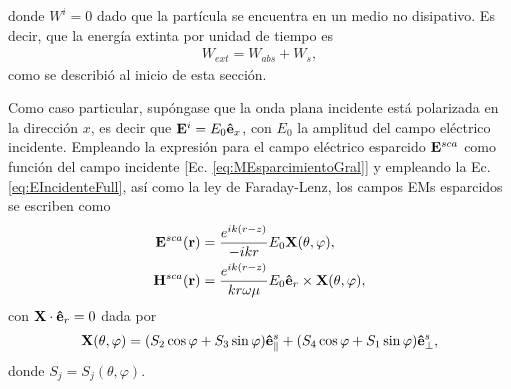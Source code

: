 donde $W^i=0$ dado que la partícula se encuentra en un medio no disipativo. Es decir, que la energía extinta por unidad de tiempo es
%
\begin{align}
W_{ext} = W_{abs} + W_s,
\end{align}
%
como se describió al inicio de esta sección.	

Como caso particular, supóngase que la onda plana incidente está polarizada en la dirección $x$, es decir que $\vb{E}^i = E_0\vu{e}_x$, con $E_0$	 la amplitud del campo eléctrico incidente. Empleando la  expresión para el campo eléctrico esparcido $\vb{E}^{sca}$ como función del campo incidente [Ec. \eqref{eq:MEsparcimientoGral}] y empleando la Ec. \eqref{eq:EIncidenteFull}, así como la ley de Faraday-Lenz, los campos EMs esparcidos se escriben como
%
\begin{align}
\vb{E}^{sca}(\vb{r}) &= \frac{e^{ik(r-z)}}{-ikr}E_0\vb{X}(\theta,\varphi),
\label{eq:EscaX}\\
\vb{H}^{sca}(\vb{r}) &= \frac{e^{ik(r-z)}}{kr\omega\mu}E_0\vu{e}_r\times\vb{X}(\theta,\varphi),
\label{eq:HscaX}
\end{align}
%
con $\vb{X}\cdot\vu{e}_r = 0$ dada por
%
\begin{align}
\vb{X}(\theta,\varphi) = (S_2\cos\varphi + S_3\sin\varphi)\vu{e}_{\parallel}^{s} + (S_4\cos\varphi + S_1\sin\varphi)\vu{e}_{\perp}^{s},
\end{align}
%
donde $S_j = S_j(\theta,\varphi)$.

